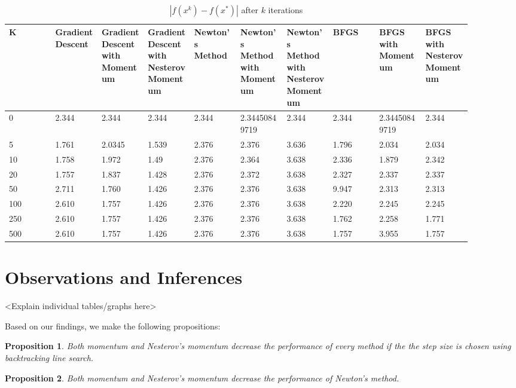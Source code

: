 \documentclass{article}
\newtheorem{prop}{Proposition}
\begin{document}
\begin{table}[H]
	\centering
	\caption{$ | f(x^k) - f(x^*) | $ after $k$ iterations}
	\label{Levy's function table}
	\begin{tabular}{|l|p{0.1\linewidth}|p{0.1\linewidth}|p{0.1\linewidth}|p{0.1\linewidth}|p{0.1\linewidth}|p{0.1\linewidth}|p{0.1\linewidth}|p{0.1\linewidth}|p{0.1\linewidth}|}
		\hline
		K & Gradient Descent & Gradient Descent with Momentum & Gradient Descent with Nesterov Momentum & Newton's Method & Newton's Method with Momentum & Newton's Method with Nesterov Momentum & BFGS & BFGS with Momentum & BFGS with Nesterov Momentum \\
		\hline
		0 & 2.344 & 2.344 & 2.344 & 2.344 & 2.34450849719 & 2.344 & 2.344 & 2.34450849719 & 2.344 \\
		\hline
		5 & 1.761 & 2.0345 & 1.539 & 2.376 & 2.376 & 3.636 & 1.796 & 2.034 & 2.034 \\
		\hline
		10 & 1.758 & 1.972 & 1.49 & 2.376 & 2.364 & 3.638 & 2.336 & 1.879 & 2.342 \\
		\hline
		20 & 1.757 & 1.837 & 1.428 & 2.376 & 2.372 & 3.638 & 2.327 & 2.337 & 2.337 \\
		\hline
		50 & 2.711 & 1.760 & 1.426 & 2.376 & 2.376 & 3.638 & 9.947 & 2.313 & 2.313 \\
		\hline
		100 & 2.610 & 1.757 & 1.426 & 2.376& 2.376 & 3.638 & 2.220 & 2.245 & 2.245 \\
		\hline
		250 & 2.610 & 1.757 & 1.426 & 2.376 & 2.376 & 3.638 & 1.762 & 2.258 & 1.771 \\
		\hline
		500 & 2.610 & 1.757 & 1.426 & 2.376 & 2.376 & 3.638 & 1.757 & 3.955 & 1.757 \\
		\hline
	\end{tabular}
\end{table}

\section{Observations and Inferences}\label{inferences}
<Explain individual tables/graphs here>

Based on our findings, we make the following propositions:

\begin{prop}
	Both momentum and Nesterov's momentum decrease the performance of every method if the the step size is chosen using backtracking line search.
\end{prop}

\begin{prop}
	Both momentum and Nesterov's momentum decrease the performance of Newton's method. 
\end{prop}
\end{document}
